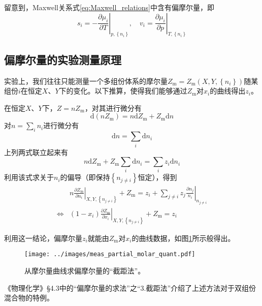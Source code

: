 \documentclass[main.tex]{subfiles}
\begin{document}
留意到，Maxwell关系式\eqref{eq:Maxwell_relations}中含有偏摩尔量，即
\[s_i=-\left.\frac{\partial\mu_i}{\partial T}\right|_{p,\left\{n_i\right\}},\quad v_i=\left.\frac{\partial\mu_i}{\partial p}\right|_{T,\left\{n_i\right\}}\]

\subsection{偏摩尔量的实验测量原理}
实验上，我们往往只能测量一个多组份体系的摩尔量$Z_\text{m}=Z_\text{m}\left(X,Y,\left\{n_i\right\}\right)$随某组份$i$在恒定$X$、$Y$下的变化。以下推算，使得我们能够通过$Z_\text{m}$对$x_i$的曲线得出$z_i$。

在恒定$X$、$Y$下，$Z=n Z_\text{m}$，对其进行微分有
\[\mathrm{d}\left(nZ_\text{m}\right)=n\mathrm{d}Z_\text{m}+Z_\text{m}\mathrm{d}n\]
对$n=\sum_i n_i$进行微分有
\[\mathrm{d}n=\sum_i\mathrm{d}n_i\]
上列两式联立起来有
\[n\mathrm{d}Z_\text{m}+Z_\text{m}\sum_i \mathrm{d}n_i=\sum_i z_i\mathrm{d}n_i\]
利用该式求关于$n_i$的偏导（即保持$\left\{n_{j\neq i}\right\}$恒定），得到
\begin{align*}
                    & n\left.\frac{\partial Z_\text{m}}{\partial n_i}\right|_{X,Y,\left\{n_{j\neq i}\right\}}+Z_\text{m}=z_i+\sum_{j\neq i}z_j\left.\frac{\partial n_j}{n_i}\right|_{n_{j\neq i}} \\
    \Leftrightarrow & \left(1-x_i\right)\left.\frac{\partial Z_\text{m}}{\partial x_i}\right|_{X,Y,\left\{n_{j\neq i}\right\}}+Z_\text{m}=z_i
\end{align*}

利用这一结论，偏摩尔量$z_i$就能由$Z_\text{m}$对$x_i$的曲线数据，如图\ref{fig:meas_partial_molar_quant}所示般得出。

\begin{figure}[h]
    \centering
    \texttt{[image: ../images/meas\_partial\_molar\_quant.pdf]}
    \caption{从摩尔量曲线求偏摩尔量的“截距法”。}
    \label{fig:meas_partial_molar_quant}
\end{figure}

《物理化学》\S 4.3中的“偏摩尔量的求法”之“3.截距法”介绍了上述方法对于双组份混合物的特例。
\end{document}

